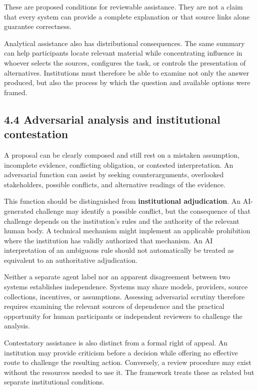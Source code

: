 \documentclass[
  10pt,
]{article}
\begin{document}
These are proposed conditions for reviewable assistance. They are not a
claim that every system can provide a complete explanation or that
source links alone guarantee correctness.

Analytical assistance also has distributional consequences. The same
summary can help participants locate relevant material while
concentrating influence in whoever selects the sources, configures the
task, or controls the presentation of alternatives. Institutions must
therefore be able to examine not only the answer produced, but also the
process by which the question and available options were framed.

\subsection{4.4 Adversarial analysis and institutional
contestation}\label{adversarial-analysis-and-institutional-contestation}

A proposal can be clearly composed and still rest on a mistaken
assumption, incomplete evidence, conflicting obligation, or contested
interpretation. An adversarial function can assist by seeking
counterarguments, overlooked stakeholders, possible conflicts, and
alternative readings of the evidence.

This function should be distinguished from \textbf{institutional
adjudication}. An AI-generated challenge may identify a possible
conflict, but the consequence of that challenge depends on the
institution's rules and the authority of the relevant human body. A
technical mechanism might implement an applicable prohibition where the
institution has validly authorized that mechanism. An AI interpretation
of an ambiguous rule should not automatically be treated as equivalent
to an authoritative adjudication.

Neither a separate agent label nor an apparent disagreement between two
systems establishes independence. Systems may share models, providers,
source collections, incentives, or assumptions. Assessing adversarial
scrutiny therefore requires examining the relevant sources of dependence
and the practical opportunity for human participants or independent
reviewers to challenge the analysis.

Contestatory assistance is also distinct from a formal right of appeal.
An institution may provide criticism before a decision while offering no
effective route to challenge the resulting action. Conversely, a review
procedure may exist without the resources needed to use it. The
framework treats these as related but separate institutional conditions.
\end{document}

